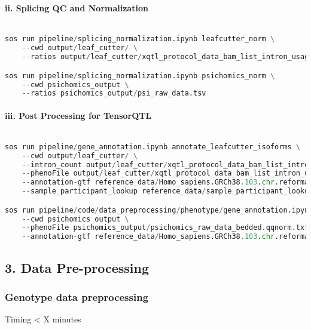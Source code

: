\documentclass[12pt]{article}
\begin{document}
\paragraph*{ii. Splicing QC and Normalization}


\noindent
\begin{lstlisting}[language=Python]

sos run pipeline/splicing_normalization.ipynb leafcutter_norm \
    --cwd output/leaf_cutter/ \
    --ratios output/leaf_cutter/xqtl_protocol_data_bam_list_intron_usage_perind.counts.gz

sos run pipeline/splicing_normalization.ipynb psichomics_norm \
    --cwd psichomics_output \
    --ratios psichomics_output/psi_raw_data.tsv

\end{lstlisting}




\paragraph*{iii. Post Processing for TensorQTL}


\noindent
\begin{lstlisting}[language=Python]

sos run pipeline/gene_annotation.ipynb annotate_leafcutter_isoforms \
    --cwd output/leaf_cutter/ \
    --intron_count output/leaf_cutter/xqtl_protocol_data_bam_list_intron_usage_perind_numers.counts.gz \
    --phenoFile output/leaf_cutter/xqtl_protocol_data_bam_list_intron_usage_perind.counts.gz_raw_data.qqnorm.txt \
    --annotation-gtf reference_data/Homo_sapiens.GRCh38.103.chr.reformatted.collapse_only.gene.gtf \
    --sample_participant_lookup reference_data/sample_participant_lookup.rnaseq

sos run pipeline/code/data_preprocessing/phenotype/gene_annotation.ipynb annotate_psichomics_isoforms \
    --cwd psichomics_output \
    --phenoFile psichomics_output/psichomics_raw_data_bedded.qqnorm.txt \
    --annotation-gtf reference_data/Homo_sapiens.GRCh38.103.chr.reformated.ERCC.gene.gtf

\end{lstlisting}




\subsection*{3. Data Pre-processing}


\subsubsection*{Genotype data preprocessing}
Timing < X minutes
\end{document}
